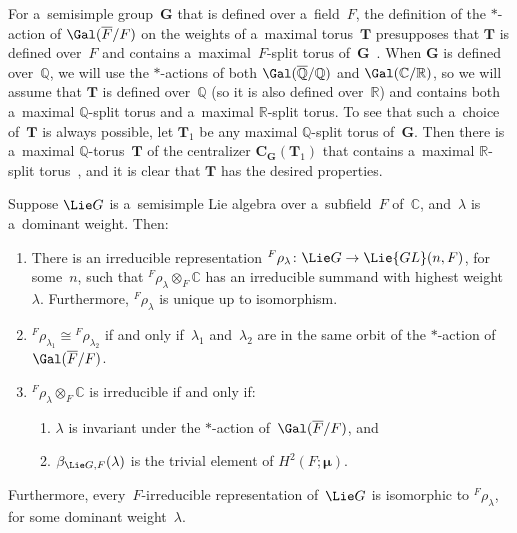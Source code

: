 \begin{rem}
For a~semisimple group~$\mathbf{G}$ that is def\/ined over a~f\/ield~$F$, the def\/inition of the $*$-action of
$\Gal(\overline{F}/F)$ on the weights of a~maximal torus~$\mathbf{T}$ presupposes that $\mathbf{T}$ is def\/ined over~$F$
and contains a~maximal~$F$-split torus of~$\mathbf{G}$~\cite[p.~66]{PlatonovRapinchukBook}.
When $\mathbf{G}$ is def\/ined over~$\mathbb{Q}$, we will use the $*$-actions of both $\Gal(\overline{\mathbb{Q}}/\mathbb{Q})$ and $\Gal(\mathbb{C}/\mathbb{R})$, so we will assume that $\mathbf{T}$ is def\/ined
over~$\mathbb{Q}$ (so it is also def\/ined over~$\mathbb{R}$) and contains both a~maximal $\mathbb{Q}$-split torus and
a~maximal $\mathbb{R}$-split torus.
To see that such a~choice of~$\mathbf{T}$ is always possible, let $\mathbf{T}_1$ be any maximal $\mathbb{Q}$-split torus
of~$\mathbf{G}$.
Then there is a~maximal $\mathbb{Q}$-torus~$\mathbf{T}$ of the centralizer $\mathbf{C}_{\mathbf{G}}(\mathbf{T}_1)$ that
contains a~maximal $\mathbb{R}$-split torus~\cite[Corollary~2 of Proposition~7.8, p.~418]{PlatonovRapinchukBook}, and it is clear
that $\mathbf{T}$ has the desired properties.
\end{rem}

\begin{prop}\label{HighWt}
Suppose $\Lie G$ is a~semisimple Lie algebra over a~subfield~$F$ of~$\mathbb{C}$, and~$\lambda$ is a~dominant weight.
Then:
\renewcommand{\labelenumi}{{\rm \theenumi.}}
\begin{enumerate}\itemsep=0pt
\item There is an irreducible representation ${}^F \rho_\lambda \colon \Lie G \to \Lie{GL}(n, F)$, for some~$n$, such
that \mbox{${}^F \rho_\lambda \otimes_F \mathbb{C}$} has an irreducible summand with highest weight~$\lambda$.
Furthermore, ${}^F \rho_\lambda$ is unique up to isomorphism.

\item ${}^F \rho_{\lambda_1} \cong {}^F \rho_{\lambda_2}$ if and only if~$\lambda_1$ and~$\lambda_2$ are in the same
orbit of the $*$-action of~$\Gal(\overline{F}/F)$.

\item
\label{HighWt-IrredIff}
${}^F \rho_\lambda \otimes_F \mathbb{C}$ is irreducible if and only if:
\begin{enumerate}[{\rm (a)}]\itemsep=0pt
\item
$\lambda$ is invariant under the $*$-action of~$\Gal(\overline{F}/F)$, and
\item
$\beta_{\Lie G,F}(\lambda)$ is the trivial element of $H^2(F; \boldsymbol\mu)$.
\end{enumerate}
\end{enumerate}
Furthermore, every~$F$-irreducible representation of~$\Lie G$ is isomorphic to ${}^F \rho_{\lambda}$, for some
dominant weight~$\lambda$.
\end{prop}

